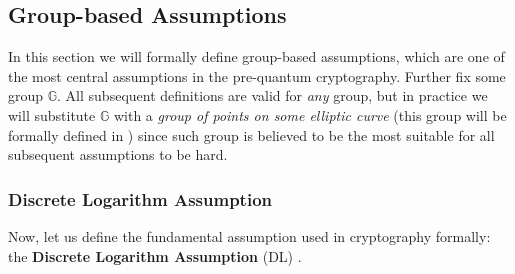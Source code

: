 \documentclass[../../book.tex]{subfiles}
\begin{document}




\subsection{Group-based Assumptions}\label{subsec:group-based-assumptions}

In this section we will formally define group-based assumptions, which are one of the most central assumptions in the pre-quantum cryptography.
Further fix some group $\mathbb{G}$. 
All subsequent definitions are valid for \textit{any} group, but in practice we will substitute $\mathbb{G}$ with a \emph{group of points on some elliptic curve} (this group will be formally defined in ) since such group is believed to be the most suitable for all subsequent assumptions to be hard.

\subsubsection{Discrete Logarithm Assumption}

Now, let us define the fundamental assumption used in cryptography formally: the \textbf{Discrete Logarithm Assumption} (DL) \cite[chapter 16]{Dan_Boneh_2023}.
\end{document}
